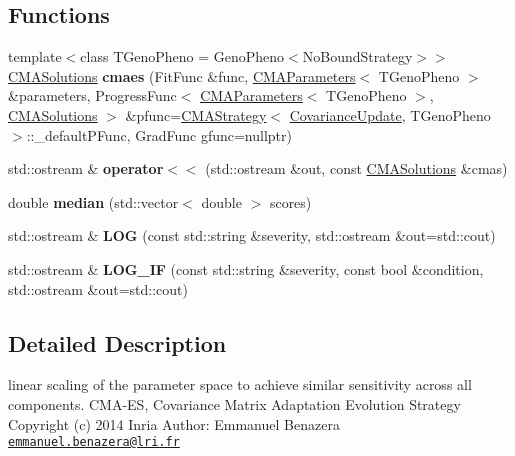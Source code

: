 \subsection*{Functions}
\begin{DoxyCompactItemize}
\item 
\hypertarget{namespacelibcmaes_ac6e46889cb95b4f1840c205406b1e4d7}{{\footnotesize template$<$class T\-Geno\-Pheno  = Geno\-Pheno$<$\-No\-Bound\-Strategy$>$$>$ }\\\hyperlink{classlibcmaes_1_1CMASolutions}{C\-M\-A\-Solutions} {\bfseries cmaes} (Fit\-Func \&func, \hyperlink{classlibcmaes_1_1CMAParameters}{C\-M\-A\-Parameters}$<$ T\-Geno\-Pheno $>$ \&parameters, Progress\-Func$<$ \hyperlink{classlibcmaes_1_1CMAParameters}{C\-M\-A\-Parameters}$<$ T\-Geno\-Pheno $>$, \hyperlink{classlibcmaes_1_1CMASolutions}{C\-M\-A\-Solutions} $>$ \&pfunc=\hyperlink{classlibcmaes_1_1CMAStrategy}{C\-M\-A\-Strategy}$<$ \hyperlink{classlibcmaes_1_1CovarianceUpdate}{Covariance\-Update}, T\-Geno\-Pheno $>$\-::\-\_\-default\-P\-Func, Grad\-Func gfunc=nullptr)}\label{namespacelibcmaes_ac6e46889cb95b4f1840c205406b1e4d7}

\item 
\hypertarget{namespacelibcmaes_a1922020e8d2259dd870ccd7893c3ea24}{std\-::ostream \& {\bfseries operator$<$$<$} (std\-::ostream \&out, const \hyperlink{classlibcmaes_1_1CMASolutions}{C\-M\-A\-Solutions} \&cmas)}\label{namespacelibcmaes_a1922020e8d2259dd870ccd7893c3ea24}

\item 
\hypertarget{namespacelibcmaes_a5b344b982de59b91af2f0c317f234f17}{double {\bfseries median} (std\-::vector$<$ double $>$ scores)}\label{namespacelibcmaes_a5b344b982de59b91af2f0c317f234f17}

\item 
\hypertarget{namespacelibcmaes_a16d45e47c7b936252e380cfbe6809c99}{std\-::ostream \& {\bfseries L\-O\-G} (const std\-::string \&severity, std\-::ostream \&out=std\-::cout)}\label{namespacelibcmaes_a16d45e47c7b936252e380cfbe6809c99}

\item 
\hypertarget{namespacelibcmaes_a3209b3dbcdada9d81d357dedf066b975}{std\-::ostream \& {\bfseries L\-O\-G\-\_\-\-I\-F} (const std\-::string \&severity, const bool \&condition, std\-::ostream \&out=std\-::cout)}\label{namespacelibcmaes_a3209b3dbcdada9d81d357dedf066b975}

\end{DoxyCompactItemize}


\subsection{Detailed Description}
linear scaling of the parameter space to achieve similar sensitivity across all components. C\-M\-A-\/\-E\-S, Covariance Matrix Adaptation Evolution Strategy Copyright (c) 2014 Inria Author\-: Emmanuel Benazera \href{mailto:emmanuel.benazera@lri.fr}{\tt emmanuel.\-benazera@lri.\-fr}

